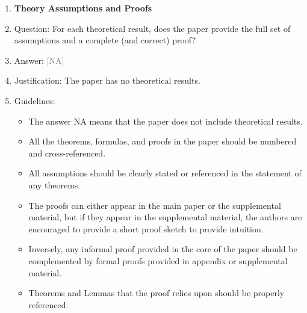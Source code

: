 \documentclass[10pt,letterpaper]{article}
\newcommand{\answerNA}[1][]{\textcolor{gray}{[NA] #1}}
\begin{document}
\begin{enumerate}
\item {\bf Theory Assumptions and Proofs}
    \item[] Question: For each theoretical result, does the paper provide the full set of assumptions and a complete (and correct) proof?
    \item[] Answer: \answerNA{}
    \item[] Justification: The paper has no theoretical results.
    \item[] Guidelines:
    \begin{itemize}
        \item The answer NA means that the paper does not include theoretical results. 
        \item All the theorems, formulas, and proofs in the paper should be numbered and cross-referenced.
        \item All assumptions should be clearly stated or referenced in the statement of any theorems.
        \item The proofs can either appear in the main paper or the supplemental material, but if they appear in the supplemental material, the authors are encouraged to provide a short proof sketch to provide intuition. 
        \item Inversely, any informal proof provided in the core of the paper should be complemented by formal proofs provided in appendix or supplemental material.
        \item Theorems and Lemmas that the proof relies upon should be properly referenced. 
    \end{itemize}


\end{enumerate}
\end{document}
